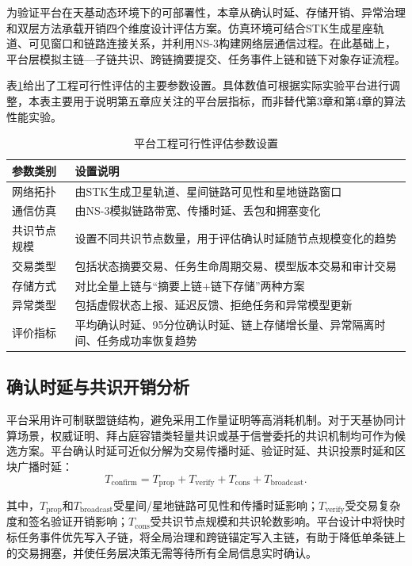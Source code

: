 为验证平台在天基动态环境下的可部署性，本章从确认时延、存储开销、异常治理和双层方法承载开销四个维度设计评估方案。仿真环境可结合STK生成星座轨道、可见窗口和链路连接关系，并利用NS-3构建网络层通信过程。在此基础上，平台层模拟主链—子链共识、跨链摘要提交、任务事件上链和链下对象存证流程。

表\ref{tab:platform_eval_param}给出了工程可行性评估的主要参数设置。具体数值可根据实际实验平台进行调整，本表主要用于说明第五章应关注的平台层指标，而非替代第3章和第4章的算法性能实验。

\begin{table}[htbp]
  \centering
  \caption{平台工程可行性评估参数设置}
  \label{tab:platform_eval_param}
  \begin{tabular}{p{4.0cm}p{8.5cm}}
    \toprule
    参数类别 & 设置说明 \\
    \midrule
    网络拓扑 & 由STK生成卫星轨道、星间链路可见性和星地链路窗口 \\
    通信仿真 & 由NS-3模拟链路带宽、传播时延、丢包和拥塞变化 \\
    共识节点规模 & 设置不同共识节点数量，用于评估确认时延随节点规模变化的趋势 \\
    交易类型 & 包括状态摘要交易、任务生命周期交易、模型版本交易和审计交易 \\
    存储方式 & 对比全量上链与“摘要上链+链下存储”两种方案 \\
    异常类型 & 包括虚假状态上报、延迟反馈、拒绝任务和异常模型更新 \\
    评价指标 & 平均确认时延、95分位确认时延、链上存储增长量、异常隔离时间、任务成功率恢复趋势 \\
    \bottomrule
  \end{tabular}
\end{table}

\subsection{确认时延与共识开销分析}

平台采用许可制联盟链结构，避免采用工作量证明等高消耗机制。对于天基协同计算场景，权威证明、拜占庭容错类轻量共识或基于信誉委托的共识机制均可作为候选方案。平台确认时延可近似分解为交易传播时延、验证时延、共识投票时延和区块广播时延：
\begin{equation}
  T_{\mathrm{confirm}}=T_{\mathrm{prop}}+T_{\mathrm{verify}}+T_{\mathrm{cons}}+T_{\mathrm{broadcast}}.
  \label{eq:confirm_delay}
\end{equation}

其中，\(T_{\mathrm{prop}}\)和\(T_{\mathrm{broadcast}}\)受星间/星地链路可见性和传播时延影响；\(T_{\mathrm{verify}}\)受交易复杂度和签名验证开销影响；\(T_{\mathrm{cons}}\)受共识节点规模和共识轮数影响。平台设计中将快时标任务事件优先写入子链，将全局治理和跨链锚定写入主链，有助于降低单条链上的交易拥塞，并使任务层决策无需等待所有全局信息实时确认。

